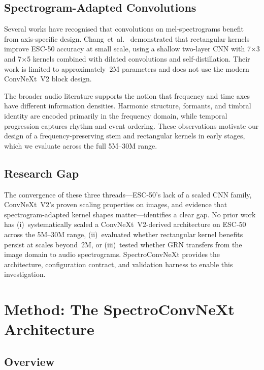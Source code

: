 \documentclass{article}
\begin{document}
\subsection{Spectrogram-Adapted Convolutions}

Several works have recognised that convolutions on mel-spectrograms benefit
from axis-specific design. Chang~et~al.~\citep{chang2026rectangular}
demonstrated that rectangular kernels improve ESC-50 accuracy at small scale,
using a shallow two-layer CNN with 7$\times$3 and 7$\times$5 kernels combined
with dilated convolutions and self-distillation. Their work is limited to
approximately~2M parameters and does not use the modern ConvNeXt~V2 block
design.

The broader audio literature supports the notion that frequency and time axes
have different information densities. Harmonic structure, formants, and timbral
identity are encoded primarily in the frequency domain, while temporal
progression captures rhythm and event ordering. These observations motivate our
design of a frequency-preserving stem and rectangular kernels in early stages,
which we evaluate across the full 5M--30M range.

\subsection{Research Gap}

The convergence of these three threads---ESC-50's lack of a scaled CNN family,
ConvNeXt~V2's proven scaling properties on images, and evidence that
spectrogram-adapted kernel shapes matter---identifies a clear gap. No prior work
has (i)~systematically scaled a ConvNeXt~V2-derived architecture on ESC-50
across the 5M--30M range, (ii)~evaluated whether rectangular kernel benefits
persist at scales beyond~2M, or (iii)~tested whether GRN transfers from the
image domain to audio spectrograms. SpectroConvNeXt provides the architecture,
configuration contract, and validation harness to enable this investigation.

\section{Method: The SpectroConvNeXt Architecture}

\subsection{Overview}
\end{document}
